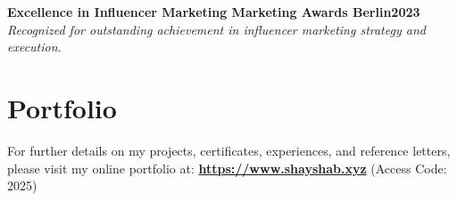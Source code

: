 \documentclass[letterpaper,10pt]{article}
\newcommand{\heading}[2]{
  \hspace{10pt}#1\hfill#2\\
}
\newcommand{\headingBf}[2]{
  \heading{\textbf{#1}}{\textbf{#2}}
}
\newcommand{\headingIt}[2]{
  \heading{\textit{#1}}{\textit{#2}}
}
\begin{document}
\headingBf{Excellence in Influencer Marketing \textnormal{Marketing Awards Berlin}}{2023}
\headingIt{Recognized for outstanding achievement in influencer marketing strategy and execution.}{}

\vspace{-0.5em}

\section*{Portfolio}

For further details on my projects, certificates, experiences, and reference letters, please visit my online portfolio at: \textbf{\href{https://www.shayshab.xyz/}{https://www.shayshab.xyz}} (Access Code: 2025)
\end{document}
